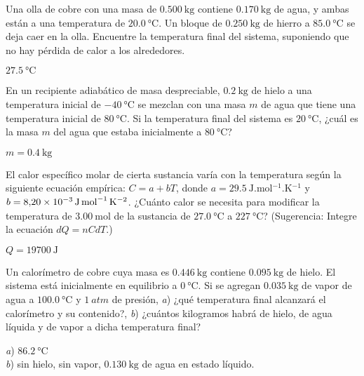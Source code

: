 %
\begin{Exercise}
  {}{}
  Una olla de cobre con una masa de $\SI{0.500}{\kilogram}$ contiene $\SI{0.170}{\kilogram}$ de agua, y ambas están a una temperatura de $\SI{20.0}{\celsius}$. Un bloque de $\SI{0.250}{\kilogram}$ de hierro a $\SI{85.0}{\celsius}$ se deja caer en la olla. Encuentre la temperatura final del sistema, suponiendo que no hay pérdida de calor a los alrededores.
\end{Exercise}
\begin{Answer}
  $\SI{27.5}{\celsius}$
\end{Answer}
%
\begin{Exercise}
  En un recipiente adiabático de masa despreciable, $\SI{0.2}{\kilogram}$ de hielo a una temperatura inicial de $\SI{-40}{\celsius}$ se mezclan con una masa $m$ de agua que tiene una temperatura inicial de $\SI{80}{\celsius}$. Si la temperatura final del sistema es $\SI{20}{\celsius}$, ¿cuál es la masa $m$ del agua que estaba inicialmente a $\SI{80}{\celsius}$?
\end{Exercise}
\begin{Answer}
  $m=\SI{0.4}{\kilogram}$
\end{Answer}
%
\begin{Exercise}
  El calor específico molar de cierta sustancia varía con la temperatura según la siguiente ecuación empírica: $C = a + bT$, donde $a=\SI{29.5}{\joule.\mole^{-1}.\kelvin^{-1}}$ y $b=\SI{8.20E-3}{\joule.\mole^{-1}.\kelvin^{-2}}$. ¿Cuánto calor se necesita para modificar la temperatura de $\SI{3.00}{\mole}$ de la sustancia de $\SI{27.0}{\celsius}$ a $\SI{227}{\celsius}$? (Sugerencia: Integre la ecuación $dQ = nCdT$.)
\end{Exercise}
\begin{Answer}
  $Q=\SI{19700}{\joule}$
\end{Answer}
%
\begin{Exercise}
  Un calorímetro de cobre cuya masa es $\SI{0.446}{\kilogram}$ contiene $\SI{0.095}{\kilogram}$ de hielo. El sistema está inicialmente en equilibrio a $\SI{0}{\celsius}$. Si se agregan $\SI{0.035}{\kilogram}$ de vapor de agua a $\SI{100.0}{\celsius}$ y $\SI{1}{atm}$ de presión, \textit{a}) ¿qué temperatura final alcanzará el calorímetro y su contenido?, \textit{b}) ¿cuántos kilogramos habrá de hielo, de agua líquida y de vapor a dicha temperatura final?
\end{Exercise}
\begin{Answer}
	\begin{minipage}[t]{.4\textwidth}
    \textit{a}) $\SI{86.2}{\celsius}$\\ \textit{b}) sin hielo, sin vapor, $\SI{0.130}{\kilogram}$ de agua en estado líquido.
  \end{minipage}
\end{Answer}
